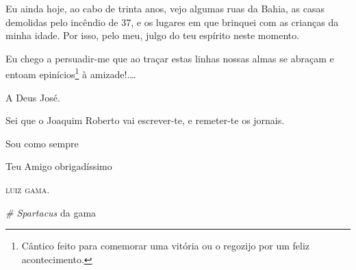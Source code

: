 {Eu ainda hoje, ao cabo de trinta anos, vejo algumas ruas da Bahia, as
casas demolidas pelo incêndio de 37, e os lugares em que brinquei com as
crianças da minha idade. Por isso, pelo meu, julgo do teu espírito neste
momento.

Eu chego a persuadir-me que ao traçar estas linhas nossas almas se
abraçam e entoam epinícios\footnote{ Cântico feito para comemorar uma
  vitória ou o regozijo por um feliz acontecimento.} à amizade!.\ldots{}

A Deus José.

Sei que o Joaquim Roberto vai escrever-te, e remeter-te os jornais.

Sou como sempre

Teu Amigo obrigadíssimo
\begin{flushright}
\textsc{luiz gama}.
\end{flushright}

\emph{\# Spartacus} da gama

}
